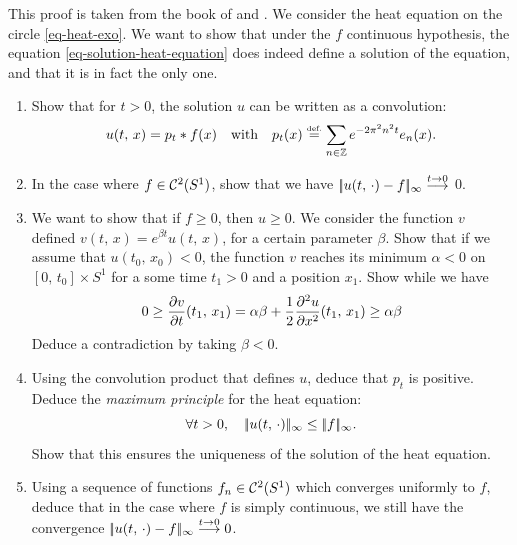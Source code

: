 
\begin{exo}
\label{exo-unicite-eq-heat}
 
 This proof is taken from the book of  and . We consider the heat equation on the circle \eqref{eq-heat-exo}. We want to show that under the $ f $ continuous hypothesis, the equation \eqref{eq-solution-heat-equation} does indeed define a solution of the equation, and that it is in fact the only one. \begin{enumerate}
\item Show that for $ t> 0 $, the solution $ u $ can be written as a convolution:
\begin{equation*}
u (t, \, x) = p_t * f(x) \quad \text{with} \quad p_t (x) \stackrel{\mbox{\upshape\tiny def.}}{=} \sum_{n \in \mathbb{Z}}{e^{- 2 \pi^2n^2 t} e_n (x)}.
\end{equation*}
 
\item In the case where $ f \in \mathcal{C}^2 (S^1) $, show that we have $ |\!| u (t, \, \cdot) - f |\!|_{\infty} \overset{t \to 0}{\longrightarrow} $ 0.
\item We want to show that if $ f \geq 0 $, then $ u \geq 0 $. We consider the function $ v $ defined $ v (t, \, x) = e^{\beta t} u (t, \, x) $, for a certain parameter $ \beta $. Show that if we assume that $ u (t_0, \, x_0) <0 $, the function $ v $ reaches its minimum $ \alpha <0 $ on $ [0, \, t_0] \times S^1 $ for a some time $ t_1> 0 $ and a position $ x_1 $. Show while we have
\begin{equation*}
0 \geq \frac{ \partial v}{\partial t} (t_1, \, x_1) = \alpha \beta + \frac{1}{2} \frac{ \partial^2 u}{\partial x^2} (t_1, \, x_1) \geq \alpha \beta
\end{equation*}
Deduce a contradiction by taking $ \beta <0 $.
\item {} Using the convolution product that defines $ u $, deduce that $ p_t $ is positive. Deduce the \textit{maximum principle} for the heat equation:
\begin{equation*}
\forall t> 0, \quad |\!| u (t, \, \cdot) |\!|_{\infty} \leq |\!| f |\!|_{\infty}.
\end{equation*}
Show that this ensures the uniqueness of the solution of the heat equation.
\item Using a sequence of functions $ f_n \in \mathcal{C}^2 (S^1) $ which converges uniformly to $ f $, deduce that in the case where $ f $ is simply continuous, we still have the convergence $ |\!| u (t, \, \cdot) - f |\!|_{\infty} \overset{t \to 0}{\longrightarrow} 0 $.
\end{enumerate}
\end{exo}
 
